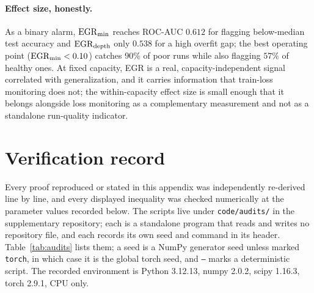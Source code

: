 \paragraph{Effect size, honestly.}
As a binary alarm, $\mathrm{EGR}_{\min}$ reaches ROC-AUC $0.612$ for flagging
below-median test accuracy and $\mathrm{EGR}_{\mathrm{depth}}$ only $0.538$ for a
high overfit gap; the best operating point ($\mathrm{EGR}_{\min} < 0.10$) catches
$90\%$ of poor runs while also flagging $57\%$ of healthy ones. At fixed
capacity, EGR is a real, capacity-independent signal correlated with
generalization, and it carries information that train-loss monitoring does
not; the within-capacity effect size is small enough that it belongs
alongside loss monitoring as a complementary measurement and not as a
standalone run-quality indicator.


\section{Verification record}
\label{app:audits}

Every proof reproduced or stated in this appendix was independently
re-derived line by line, and every displayed inequality was checked
numerically at the parameter values recorded below. The scripts live under
\texttt{code/audits/} in the supplementary repository; each is a standalone
program that reads and writes no repository file, and each records its own
seed and command in its header. Table~\ref{tab:audits} lists them; a seed is
a NumPy generator seed unless marked \texttt{torch}, in which case it is the
global torch seed, and \texttt{---} marks a deterministic script. The
recorded environment is Python 3.12.13, numpy 2.0.2, scipy 1.16.3, torch
2.9.1, CPU only.


